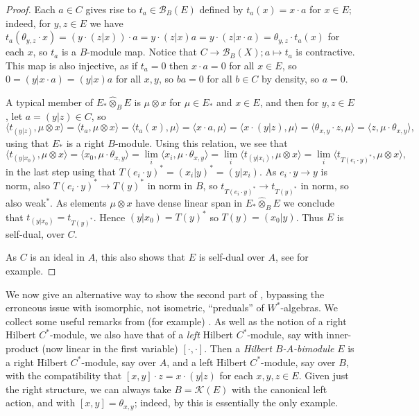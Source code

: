 \documentclass[a4paper,11pt]{article}
\theoremstyle{plain}
\theoremstyle{remark}
\newcommand{\mc}[1]{\mathcal{#1}}
\newcommand{\ip}[2]{{\langle {#1} , {#2} \rangle}}
\newcommand{\proten}{\widehat\otimes}
\begin{document}
\begin{proof}
Each $a\in C$ gives rise to $t_a \in \mc B_B(E)$ defined by $t_a(x) = x\cdot a$ for $x\in E$; indeed, for $y,z\in E$ we have $t_a(\theta_{y,z}\cdot x) = (y\cdot(z|x))\cdot a = y\cdot (z|x)a = y\cdot (z|x\cdot a) = \theta_{y,z} \cdot t_a(x)$ for each $x$, so $t_a$ is a $B$-module map.  Notice that $C \to \mc B_B(X); a \mapsto t_a$ is contractive.  This map is also injective, as if $t_a=0$ then $x \cdot a = 0$ for all $x\in E$, so $0 = (y|x\cdot a) = (y|x) a$ for all $x,y$, so $ba=0$ for all $b\in C$ by density, so $a=0$.

A typical member of $E_* \proten_B E$ is $\mu\otimes x$ for $\mu\in E_*$ and $x\in E$, and then for $y,z\in E$, let $a=(y|z)\in C$, so
\[ \ip{ t_{(y|z)} }{ \mu\otimes x } = \ip{ t_a }{ \mu\otimes x }
= \ip{t_a(x)}{\mu} = \ip{x\cdot a}{\mu}
= \ip{x \cdot (y|z)}{\mu} = \ip{\theta_{x,y}\cdot z}{\mu}
= \ip{z}{\mu \cdot \theta_{x,y}}, \]
using that $E_*$ is a right $B$-module.  Using this relation, we see that
\[ \ip{t_{(y|x_0)}}{\mu\otimes x} = \ip{x_0}{\mu\cdot\theta_{x,y}}
= \lim_i \ip{x_i}{\mu\cdot\theta_{x,y}}
= \lim_i \ip{t_{(y|x_i)}}{\mu\otimes x}
= \lim_i \ip{t_{T(e_i\cdot y)^*}}{\mu\otimes x}, \]
in the last step using that $T(e_i\cdot y)^* = (x_i|y)^* = (y|x_i)$.  As $e_i\cdot y \to y$ is norm, also $T(e_i\cdot y)^* \to T(y)^*$ in norm in $B$, so $t_{T(e_i\cdot y)^*} \to t_{T(y)^*}$ in norm, so also weak$^*$.  As elements $\mu\otimes x$ have dense linear span in $E_* \proten_B E$ we conclude that $t_{(y|x_0)} = t_{T(y)^*}$.  Hence $(y|x_0) = T(y)^*$ so $T(y) = (x_0|y)$.  Thus $E$ is self-dual, over $C$.

As $C$ is an ideal in $A$, this also shows that $E$ is self-dual over $A$, see \cite[Lemma~8.5.2]{BlecherLeMerdy_Book} for example.
\end{proof}

We now give an alternative way to show the second part of \cite[Theorem~2.6]{Schweizer_HilbModsPredual}, bypassing the erroneous issue with isomorphic, not isometric, ``preduals'' of $W^*$-algebras.  We collect some useful remarks from (for example) \cite{BMS_quasimults}.  As well as the notion of a right Hilbert $C^*$-module, we also have that of a \emph{left} Hilbert $C^*$-module, say with inner-product (now linear in the first variable) $[\cdot, \cdot]$.  Then a \emph{Hilbert $B$-$A$-bimodule} $E$ is a right Hilbert $C^*$-module, say over $A$, and a left Hilbert $C^*$-module, say over $B$, with the compatibility that $[x,y]\cdot z = x \cdot (y|z)$ for each $x,y,z\in E$.  Given just the right structure, we can always take $B = \mc K(E)$ with the canonical left action, and with $[x,y] = \theta_{x,y}$; indeed, by \cite[Proposition~1.10]{BMS_quasimults} this is essentially the only example.
\end{document}
